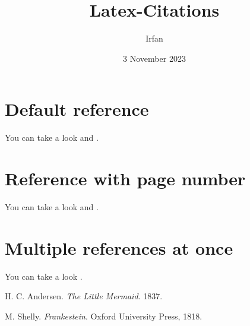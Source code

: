 \documentclass{article}
\title{Latex-Citations}
\author{Irfan}
\date{3 November 2023}
\begin{document}
  \maketitle

  \section{Default reference}
  You can take a look \cite{andersen} and \cite{shelly}.

  \section{Reference with page number}
  You can take a look \cite[p.~37]{andersen} and \cite[p.~40]{shelly}.

  \section{Multiple references at once}
  You can take a look \cite{andersen,shelly}.

  \vspace{1cm}

  \begin{thebibliography}{2}
    H. C. Andersen. \textit{The Little Mermaid}. 1837.

    M. Shelly. \textit{Frankestein}. Oxford University Press, 1818.
  \end{thebibliography}
\end{document}
